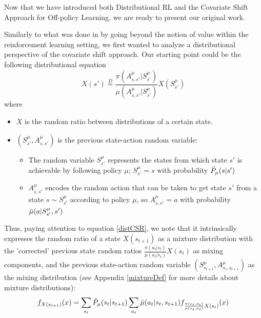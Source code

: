 \documentclass[12pt,a4paper,openright,twoside]{article}
\DeclareMathOperator*{\E}{\mathbb{E}}
\numberwithin{equation}{section}
\theoremstyle{definition}
\theoremstyle{remark}
\theoremstyle{plain}
\begin{document}
Now that we have introduced both Distributional RL and the Covariate Shift Approach for Off-policy Learning, we are ready to present our original work.

Similarly to what was done in \cite{DRL} by going beyond the notion of value within the reinforcement learning setting, we first wanted to analyze a distributional perspective of the covariate shift approach. Our starting point could be the following distributional equation
\begin{equation} \label{distCSR}
    X(s') \stackrel{D}{=} \frac{\pi(A^\mu_{s,s'}|S^\mu_{s'})}{\mu(A^\mu_{s,s'}|S^\mu_{s'})} X(S^\mu_{s'}) 
\end{equation}
where
\begin{itemize}
    \item $X$ is the random ratio between distributions of a certain state.%
    
    \item $(S^\mu_{s'},A^\mu_{s,s'} )$ is the previous state-action random variable:
   	\begin{itemize}
    	\item The random variable $S^\mu_{s'}$ represents the states from which state $s'$ is achievable by following policy $\mu$; $S^\mu_{s'} =s$ with probability $\Bar{P}_\mu(s|s')$
   	 	\item $A^\mu_{s,s'}$ encodes the random action that can be taken to get state $s'$ from a state $s\sim S^\mu_{s'}$ according to policy $\mu$, so $A^\mu_{s,s'} =a$ with probability $\Bar{\mu}(a|S^\mu_{s'},s')$
   	 \end{itemize}
 
\end{itemize}

Thus, paying attention to equation \ref{distCSR}, we note that it intrinsically expresses the random ratio of a state $X(s_{t+1})$ as a mixture distribution with the 'corrected' previous state random ratios $\frac{\pi (a_t | s_{t})}{\mu (a_t |s_t)} X(s_{t})$ as mixing components, and the previous state-action random variable $(S^\mu_{s_{t+1}},A^\mu_{s_{t},s_{t+1}} )$ as the mixing distribution (see Appendix \ref{mixtureDef} for more details about mixture distributions):
\begin{equation} \label{densityDCS}
    f_{X(s_{t+1})}(x) = \sum_{s_{t}} \Bar{P}_\mu (s_{t} | s_{t+1}) \sum_{a_t} \Bar{\mu}(a_t|s_{t},s_{t+1}) f_{\frac{\pi(s_{t},a_{t})}{\mu(s_{t},a_{t})} X(s_{t})}(x) 
\end{equation}
\end{document}
